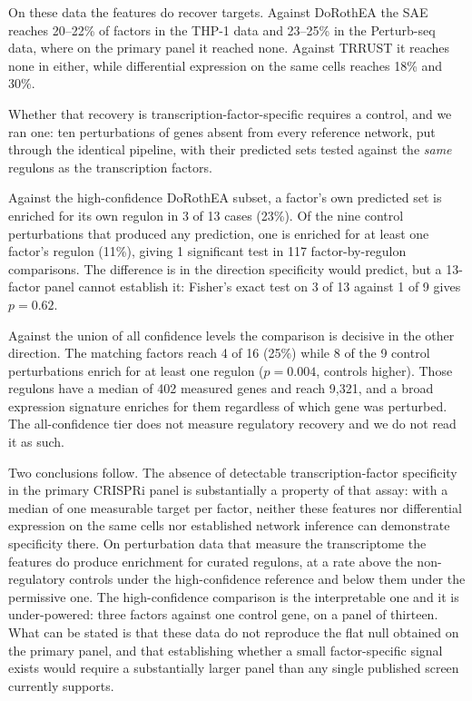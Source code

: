 On these data the features do recover targets. Against DoRothEA the SAE reaches 20--22\% of factors
in the THP-1 data and 23--25\% in the Perturb-seq data, where on the primary panel it reached none.
Against TRRUST it reaches none in either, while differential expression on the same cells reaches
18\% and 30\%.

Whether that recovery is transcription-factor-specific requires a control, and we ran one: ten
perturbations of genes absent from every reference network, put through the identical pipeline,
with their predicted sets tested against the \emph{same} regulons as the transcription factors.

Against the high-confidence DoRothEA subset, a factor's own predicted set is enriched for its own
regulon in 3 of 13 cases (23\%). Of the nine control perturbations that produced any prediction,
one is enriched for at least one factor's regulon (11\%), giving 1 significant test in 117
factor-by-regulon comparisons. The difference is in the direction specificity would predict, but a
13-factor panel cannot establish it: Fisher's exact test on 3 of 13 against 1 of 9 gives
$p = 0.62$.

Against the union of all confidence levels the comparison is decisive in the other direction. The
matching factors reach 4 of 16 (25\%) while 8 of the 9 control perturbations enrich for at least
one regulon ($p = 0.004$, controls higher). Those regulons have a median of 402 measured genes and
reach 9,321, and a broad expression signature enriches for them regardless of which gene was
perturbed. The all-confidence tier does not measure regulatory recovery and we do not read it as
such.

Two conclusions follow. The absence of detectable transcription-factor specificity in the primary
CRISPRi panel is substantially a property of that assay: with a median of one measurable target per
factor, neither these features nor differential expression on the same cells nor established
network inference can demonstrate specificity there. On perturbation data that measure the
transcriptome the features do produce enrichment for curated regulons, at a rate above the
non-regulatory controls under the high-confidence reference and below them under the permissive
one. The high-confidence comparison is the interpretable one and it is under-powered: three factors
against one control gene, on a panel of thirteen. What can be stated is that these data do not
reproduce the flat null obtained on the primary panel, and that establishing whether a small
factor-specific signal exists would require a substantially larger panel than any single published
screen currently supports.
